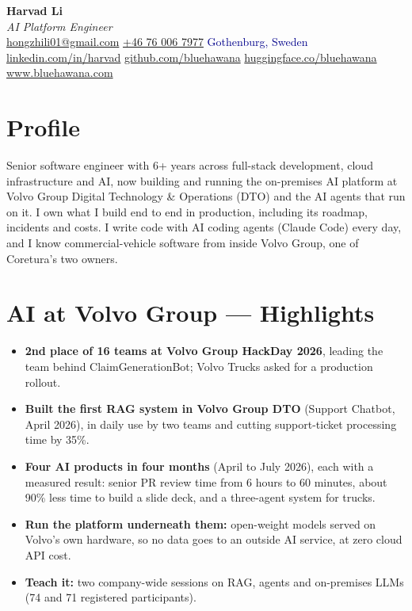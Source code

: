 \documentclass[a4paper,10pt]{article}
\begin{document}
\pagestyle{empty}

\begin{center}
{\LARGE \textbf{Harvad Li}}\\[8pt]
{\Large \textit{AI Platform Engineer}}\\[8pt]
\textcolor{darkblue}{
  \href{mailto:hongzhili01@gmail.com}{hongzhili01@gmail.com} \textbar{}
  \href{tel:+46760067977}{+46 76 006 7977} \textbar{}
  Gothenburg, Sweden
}\\[3pt]
\textcolor{darkblue}{
  \href{https://www.linkedin.com/in/harvad/}{linkedin.com/in/harvad} \textbar{}
  \href{https://github.com/bluehawana}{github.com/bluehawana} \textbar{}
  \href{https://huggingface.co/bluehawana}{huggingface.co/bluehawana} \textbar{}
  \href{https://www.bluehawana.com}{www.bluehawana.com}
}
\end{center}

\section*{Profile}
Senior software engineer with 6+ years across full-stack development, cloud infrastructure and AI, now building and running the on-premises AI platform at Volvo Group Digital Technology \& Operations (DTO) and the AI agents that run on it. I own what I build end to end in production, including its roadmap, incidents and costs. I write code with AI coding agents (Claude Code) every day, and I know commercial-vehicle software from inside Volvo Group, one of Coretura's two owners.

\section*{AI at Volvo Group --- Highlights}
\begin{itemize}
  \item \textbf{2nd place of 16 teams at Volvo Group HackDay 2026}, leading the team behind ClaimGenerationBot; Volvo Trucks asked for a production rollout.
  \item \textbf{Built the first RAG system in Volvo Group DTO} (Support Chatbot, April 2026), in daily use by two teams and cutting support-ticket processing time by 35\%.
  \item \textbf{Four AI products in four months} (April to July 2026), each with a measured result: senior PR review time from 6 hours to 60 minutes, about 90\% less time to build a slide deck, and a three-agent system for trucks.
  \item \textbf{Run the platform underneath them:} open-weight models served on Volvo's own hardware, so no data goes to an outside AI service, at zero cloud API cost.
  \item \textbf{Teach it:} two company-wide sessions on RAG, agents and on-premises LLMs (74 and 71 registered participants).
\end{itemize}
\end{document}
